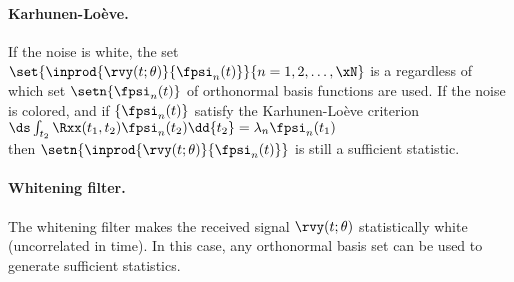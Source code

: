 \paragraph{Karhunen-Lo\`{e}ve.}
If the noise is white, the set $\set{\inprod{\rvy(t;\theta)}{\fpsi_n(t)}}{n=1,2,\ldots,\xN}$
is a  regardless of which
set $\setn{\fpsi_n(t)}$ of orthonormal basis functions are used.
If the noise is colored, and if $\{\fpsi_n(t)\}$ satisfy the
Karhunen-Lo\`{e}ve criterion
\\\indentx$\ds\int_{t_2}\Rxx(t_1,t_2)\fpsi_n(t_2)\dd{t_2} = \lambda_n \fpsi_n(t_1)$\\
then $\setn{\inprod{\rvy(t;\theta)}{\fpsi_n(t)}}$ is still a sufficient statistic.

\paragraph{Whitening filter.}
The whitening filter makes the received signal $\rvy(t;\theta)$ statistically white
(uncorrelated in time). In this case,
any orthonormal basis set can be used to generate sufficient statistics.




